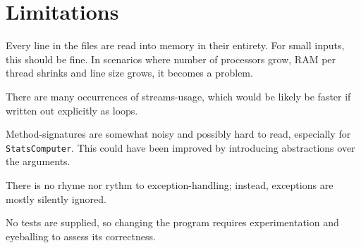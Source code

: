\documentclass[a4paper,11pt]{article}
\begin{document}
\section{Limitations}

Every line in the files are read into memory in their entirety.  For
small inputs, this should be fine.  In scenarios where number of
processors grow, RAM per thread shrinks and line size grows, it
becomes a problem.

There are many occurrences of streams-usage, which would be likely be
faster if written out explicitly as loops.

Method-signatures are somewhat noisy and possibly hard to read,
especially for \texttt{StatsComputer}.  This could have been improved
by introducing abstractions over the arguments.

There is no rhyme nor rythm to exception-handling; instead, exceptions
are mostly silently ignored.

No tests are supplied, so changing the program requires
experimentation and eyeballing to assess its correctness.
\end{document}
